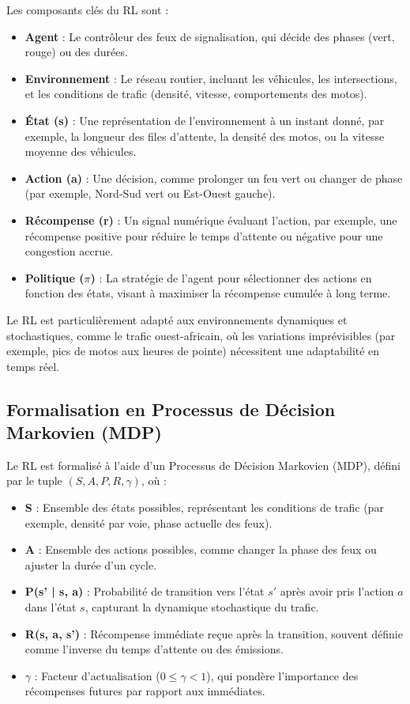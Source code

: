 Les composants clés du RL sont :
\begin{itemize}
    \item \textbf{Agent} : Le contrôleur des feux de signalisation, qui décide des phases (vert, rouge) ou des durées.
    \item \textbf{Environnement} : Le réseau routier, incluant les véhicules, les intersections, et les conditions de trafic (densité, vitesse, comportements des motos).
    \item \textbf{État (s)} : Une représentation de l'environnement à un instant donné, par exemple, la longueur des files d'attente, la densité des motos, ou la vitesse moyenne des véhicules.
    \item \textbf{Action (a)} : Une décision, comme prolonger un feu vert ou changer de phase (par exemple, Nord-Sud vert ou Est-Ouest gauche).
    \item \textbf{Récompense (r)} : Un signal numérique évaluant l'action, par exemple, une récompense positive pour réduire le temps d'attente ou négative pour une congestion accrue.
    \item \textbf{Politique ($\pi$)} : La stratégie de l'agent pour sélectionner des actions en fonction des états, visant à maximiser la récompense cumulée à long terme.
\end{itemize}

Le RL est particulièrement adapté aux environnements dynamiques et stochastiques, comme le trafic ouest-africain, où les variations imprévisibles (par exemple, pics de motos aux heures de pointe) nécessitent une adaptabilité en temps réel.

\subsection{Formalisation en Processus de Décision Markovien (MDP)}
\label{subsec:rl_mdp}

Le RL est formalisé à l'aide d'un Processus de Décision Markovien (MDP), défini par le tuple $(S, A, P, R, \gamma)$, où :
\begin{itemize}
    \item \textbf{S} : Ensemble des états possibles, représentant les conditions de trafic (par exemple, densité par voie, phase actuelle des feux).
    \item \textbf{A} : Ensemble des actions possibles, comme changer la phase des feux ou ajuster la durée d'un cycle.
    \item \textbf{P(s' | s, a)} : Probabilité de transition vers l'état $s'$ après avoir pris l'action $a$ dans l'état $s$, capturant la dynamique stochastique du trafic.
    \item \textbf{R(s, a, s')} : Récompense immédiate reçue après la transition, souvent définie comme l'inverse du temps d'attente ou des émissions.
    \item \textbf{$\gamma$} : Facteur d'actualisation ($0 \leq \gamma < 1$), qui pondère l'importance des récompenses futures par rapport aux immédiates.
\end{itemize}

